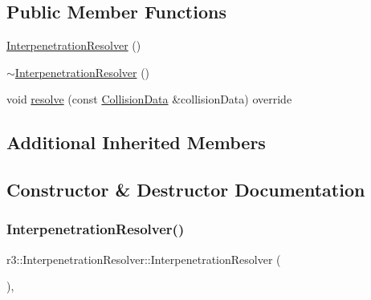 \subsection*{Public Member Functions}
\begin{DoxyCompactItemize}
\item 
\mbox{\hyperlink{classr3_1_1_interpenetration_resolver_a6a739e8121bba89238f0db2a573eb272}{Interpenetration\+Resolver}} ()
\item 
\mbox{\hyperlink{classr3_1_1_interpenetration_resolver_a2c0f47fd620356e06fb9e16387b7e83b}{$\sim$\+Interpenetration\+Resolver}} ()
\item 
void \mbox{\hyperlink{classr3_1_1_interpenetration_resolver_a7a5dfd8678e5b056ec0978e857cca0ef}{resolve}} (const \mbox{\hyperlink{classr3_1_1_collision_data}{Collision\+Data}} \&collision\+Data) override
\end{DoxyCompactItemize}
\subsection*{Additional Inherited Members}


\subsection{Constructor \& Destructor Documentation}
\mbox{\label{classr3_1_1_interpenetration_resolver_a6a739e8121bba89238f0db2a573eb272}} 
\subsubsection{\texorpdfstring{Interpenetration\+Resolver()}{InterpenetrationResolver()}}
{\footnotesize\ttfamily r3\+::\+Interpenetration\+Resolver\+::\+Interpenetration\+Resolver (\begin{DoxyParamCaption}{ }\end{DoxyParamCaption})\hspace{0.3cm}{\ttfamily [explicit]}, {\ttfamily [default]}}

\mbox{\label{classr3_1_1_interpenetration_resolver_a2c0f47fd620356e06fb9e16387b7e83b}} 
